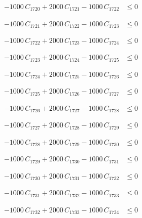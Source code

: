 \documentclass[a4paper,11pt]{article}
\begin{document}
\begin{align}
-1000\,C_{1720} + 2000\,C_{1721} - 1000\,C_{1722} &\leq 0 \nonumber
\end{align}

\begin{align}
-1000\,C_{1721} + 2000\,C_{1722} - 1000\,C_{1723} &\leq 0 \nonumber
\end{align}

\begin{align}
-1000\,C_{1722} + 2000\,C_{1723} - 1000\,C_{1724} &\leq 0 \nonumber
\end{align}

\begin{align}
-1000\,C_{1723} + 2000\,C_{1724} - 1000\,C_{1725} &\leq 0 \nonumber
\end{align}

\begin{align}
-1000\,C_{1724} + 2000\,C_{1725} - 1000\,C_{1726} &\leq 0 \nonumber
\end{align}

\begin{align}
-1000\,C_{1725} + 2000\,C_{1726} - 1000\,C_{1727} &\leq 0 \nonumber
\end{align}

\begin{align}
-1000\,C_{1726} + 2000\,C_{1727} - 1000\,C_{1728} &\leq 0 \nonumber
\end{align}

\begin{align}
-1000\,C_{1727} + 2000\,C_{1728} - 1000\,C_{1729} &\leq 0 \nonumber
\end{align}

\begin{align}
-1000\,C_{1728} + 2000\,C_{1729} - 1000\,C_{1730} &\leq 0 \nonumber
\end{align}

\begin{align}
-1000\,C_{1729} + 2000\,C_{1730} - 1000\,C_{1731} &\leq 0 \nonumber
\end{align}

\begin{align}
-1000\,C_{1730} + 2000\,C_{1731} - 1000\,C_{1732} &\leq 0 \nonumber
\end{align}

\begin{align}
-1000\,C_{1731} + 2000\,C_{1732} - 1000\,C_{1733} &\leq 0 \nonumber
\end{align}

\begin{align}
-1000\,C_{1732} + 2000\,C_{1733} - 1000\,C_{1734} &\leq 0 \nonumber
\end{align}
\end{document}
